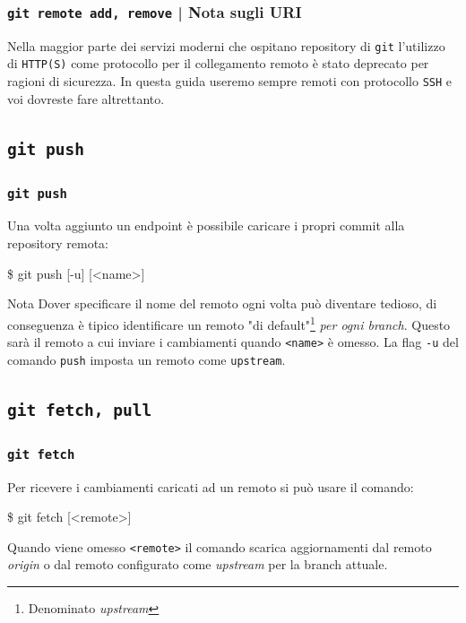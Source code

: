 \documentclass{beamer}
\begin{document}
\begin{frame}
  \frametitle{\texttt{git remote add, remove} | Nota sugli URI}
  Nella maggior parte dei servizi moderni che ospitano repository di \texttt{git}
  l'utilizzo di \texttt{HTTP(S)} come protocollo per il collegamento remoto \`e
  stato deprecato per ragioni di sicurezza. In questa guida useremo sempre
  remoti con protocollo \texttt{SSH} e voi dovreste fare altrettanto.
\end{frame}

\subsection{\texttt{git push}}
\begin{frame}
  \frametitle{\texttt{git push}}
  Una volta aggiunto un endpoint \`e possibile caricare i propri commit alla
  repository remota:
  \begin{semiverbatim}
  \$ git push [-u] [<name>]
  \end{semiverbatim} \pause
  \begin{block}{Nota}
    Dover specificare il nome del remoto ogni volta pu\`o diventare tedioso, di
    conseguenza \`e tipico identificare un remoto "di default"\footnote{Denominato \emph{upstream}}
    \emph{per ogni branch}. Questo sar\`a il remoto a cui inviare i cambiamenti
    quando \texttt{<name>} \`e omesso. La flag \texttt{-u} del comando \texttt{push}
    imposta un remoto come \texttt{upstream}.
  \end{block}
\end{frame}

\subsection{\texttt{git fetch, pull}}
\begin{frame}
  \frametitle{\texttt{git fetch}}
  Per ricevere i cambiamenti caricati ad un remoto si pu\`o usare il comando:
  \begin{semiverbatim}
  \$ git fetch [<remote>]
  \end{semiverbatim} \pause
  Quando viene omesso \texttt{<remote>} il comando scarica aggiornamenti dal
  remoto \emph{origin} o dal remoto configurato come \emph{upstream} per la
  branch attuale.
\end{frame}
\end{document}
